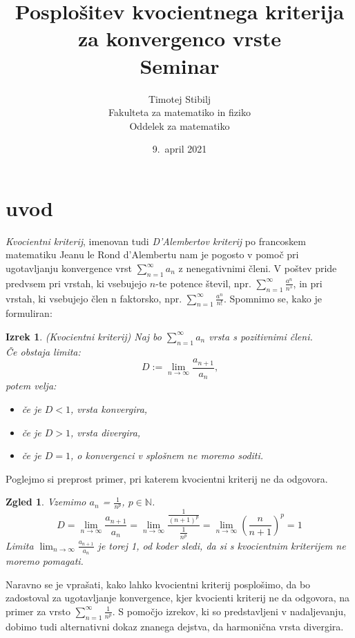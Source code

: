 \documentclass[a4paper,12pt]{article}
\title{Posplošitev kvocientnega kriterija za konvergenco vrste \\ 
\Large Seminar}
\author{Timotej Stibilj \\
Fakulteta za matematiko in fiziko \\
Oddelek za matematiko}
\date{9.\ april 2021}
\def\N{\mathbb{N}} %
\newtheorem{izrek}{Izrek}
\newtheorem{zgled}{Zgled}
\begin{document}
\maketitle

\section{uvod}

\emph{Kvocientni kriterij}, imenovan tudi \emph{D'Alembertov kriterij} po francoskem matematiku Jeanu le Rond d'Alembertu
nam je pogosto v pomoč pri ugotavljanju konvergence vrst $\sum_{n = 1}^{\infty}{a_n}$ z nenegativnimi členi. 
V poštev pride predvsem pri vrstah, ki vsebujejo $n$-te potence števil, npr. $\sum_{n = 1}^{\infty}{\frac{a^n}{n^s}}$, 
in pri vrstah, ki vsebujejo člen n faktorsko, npr. $\sum_{n = 1}^{\infty}{\frac{a^n}{n!}}$.
Spomnimo se, kako je formuliran:\\

\noindent
\begin{izrek}(Kvocientni kriterij) Naj bo $\sum_{n = 1}^{\infty}{a_n}$ vrsta s pozitivnimi členi.\\
    Če obstaja limita:
    \[
        D := \lim_{n \to \infty} \frac{a_{n + 1}}{a_n} \text{,}
    \]
    potem velja:
    \begin{itemize}
        \item če je $ D < 1 $, vrsta konvergira,
        \item če je $D > 1$, vrsta divergira,
        \item če je $D = 1$, o konvergenci v splošnem ne moremo soditi.
    \end{itemize}
\end{izrek}

Poglejmo si preprost primer, pri katerem kvocientni kriterij ne da odgovora.

\begin{zgled}
    Vzemimo $a_n$ = $\frac{1}{n^p}$, $p \in \N$.
    \[
        D = \lim_{n \to \infty} \frac{a_{n + 1}}{a_n}
        = \lim_{n \to \infty} \frac{\frac{1}{(n+1)^p}}{\frac{1}{n^p}}
        = \lim_{n \to \infty} \left( \frac{n}{n + 1} \right)^p
        = 1
    \]
    Limita $ \lim_{n \to \infty} \frac{a_{n + 1}}{a_n} $ je torej 1, od koder sledi, da si s kvocientnim kriterijem ne moremo pomagati.
\end{zgled}

Naravno se je vprašati, kako lahko kvocientni kriterij posplošimo, da bo zadostoval za ugotavljanje konvergence,
kjer kvocienti kriterij ne da odgovora, na primer za vrsto $\sum_{n = 1}^{\infty}{\frac{1}{n^p}}$.
S pomočjo izrekov, ki so predstavljeni v nadaljevanju, dobimo tudi alternativni dokaz znanega dejstva, da harmonična vrsta divergira.
\end{document}
